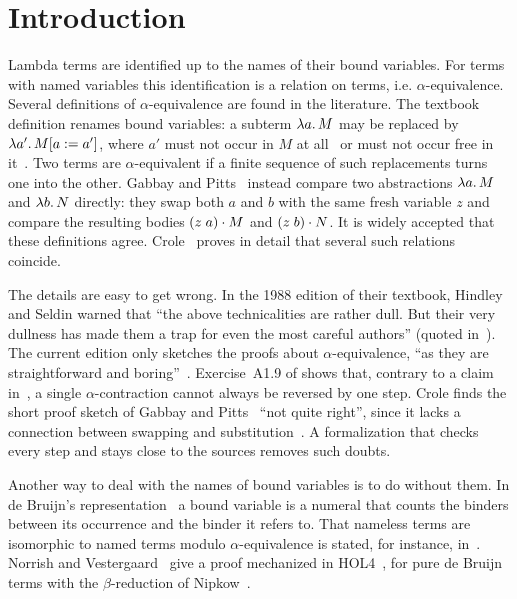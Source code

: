 \section{Introduction}
\label{sec:introduction}

Lambda terms are identified up to the names of their
bound variables. For terms with named variables this identification is
a relation on terms, i.e. $\alpha$-equivalence. 
Several definitions of $\alpha$-equivalence are found in the literature.
The textbook definition renames
bound variables: a subterm $\lambda a.\,M$ may be replaced by
$\lambda a'.\,M[a \mathrel{{:}{=}} a']$, where $a'$ must not occur in $M$ at
all~\cite[Definition~2.1.11]{barendregt1985a} or must not occur free
in it~\cite[Definition~1.17]{hindley2008a}. Two terms are
$\alpha$-equivalent if a finite sequence of such replacements turns one into
the other. Gabbay and Pitts~\cite[Proposition~2.2]{gabbay2002a}
instead compare two abstractions $\lambda a.\,M$ and $\lambda b.\,N$
directly: they swap both $a$ and $b$ with the same fresh variable $z$
and compare the resulting bodies $(z\;a) \cdot M$ and
$(z\;b) \cdot N$. It is widely accepted that these
definitions agree.  Crole~\cite{crole2012a} proves in detail that
several such relations coincide.

The details are easy to get wrong. In the 1988 edition of their
textbook, Hindley and Seldin warned that ``the above technicalities
are rather dull. But their very dullness has made them a trap for even
the most careful authors'' (quoted in~\cite[p.~2]{crole2012a}). The
current edition only sketches the proofs about $\alpha$-equivalence, ``as
they are straightforward and boring''~\cite[p.~277]{hindley2008a}. 
Exercise~A1.9 of \cite{hindley2008a} shows that, contrary to a claim
in~\cite[p.~91]{curry1958a}, a single $\alpha$-contraction cannot always be reversed by one step.
Crole finds the short proof sketch of Gabbay and
Pitts~\cite[Proposition~2.2]{gabbay2002a} ``not quite right'', since
it lacks a connection between swapping and
substitution~\cite[p.~5]{crole2012a}. A formalization that checks every
step and stays close to the sources removes such doubts.

Another way to deal with the names of bound variables is to do without
them. In de Bruijn's representation~\cite{debruijn1972a} a bound variable is a numeral that
counts the binders between its occurrence and the binder it refers to.
That nameless terms are isomorphic to named terms modulo
$\alpha$-equivalence is stated, for instance,
in~\cite[Appendix~C]{barendregt1985a}. Norrish and
Vestergaard~\cite{norrish2007a} give a proof mechanized in HOL4~\cite{slind2008a}, for
pure de Bruijn terms with the $\beta$-reduction of
Nipkow~\cite{nipkow2001a}.


